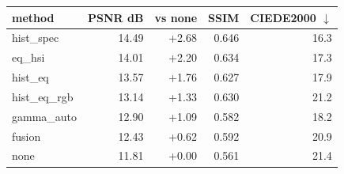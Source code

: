 \begin{tabular}{lrrrr}
\toprule
method & PSNR dB & vs none & SSIM & CIEDE2000 $\downarrow$ \\
\midrule
hist\_spec & 14.49 & +2.68 & 0.646 & 16.3 \\
eq\_hsi & 14.01 & +2.20 & 0.634 & 17.3 \\
hist\_eq & 13.57 & +1.76 & 0.627 & 17.9 \\
hist\_eq\_rgb & 13.14 & +1.33 & 0.630 & 21.2 \\
gamma\_auto & 12.90 & +1.09 & 0.582 & 18.2 \\
fusion & 12.43 & +0.62 & 0.592 & 20.9 \\
none & 11.81 & +0.00 & 0.561 & 21.4 \\
\bottomrule
\end{tabular}
